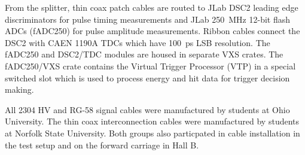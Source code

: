 From the splitter, thin coax patch cables are routed to JLab DSC2 leading edge discriminators for pulse timing measurements and JLab 250~MHz 12-bit flash ADCs (fADC250) for pulse amplitude measurements.  Ribbon cables connect the DSC2 with CAEN 1190A TDCs which have 100~ps LSB resolution. The fADC250 and DSC2/TDC modules are housed in separate VXS crates.  The fADC250/VXS crate contains the
Virtual Trigger Processor (VTP) in a special switched slot which is used to process energy and hit data for
trigger decision making.

All 2304 HV and RG-58 signal cables were manufactured by students at Ohio University.  The thin coax interconnection cables were  manufactured by students at Norfolk State University.  Both groups also particpated in cable installation in the test setup and on the forward carriage in Hall B.  





